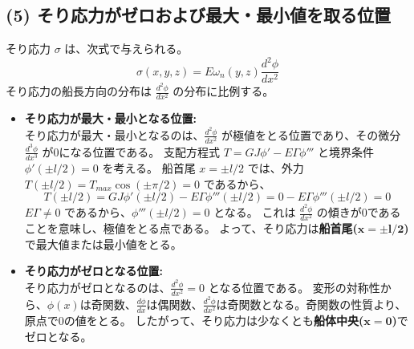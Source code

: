 \documentclass[a4j,12pt]{jsarticle}
\begin{document}
\subsection*{(5) そり応力がゼロおよび最大・最小値を取る位置}
そり応力 $\sigma$ は、次式で与えられる。
$$\sigma(x, y, z) = E \omega_n(y, z) \frac{d^2\phi}{dx^2}$$
そり応力の船長方向の分布は $\frac{d^2\phi}{dx^2}$ の分布に比例する。
\begin{itemize}
    \item \textbf{そり応力が最大・最小となる位置:} \\
    そり応力が最大・最小となるのは、$\frac{d^2\phi}{dx^2}$ が極値をとる位置であり、その微分 $\frac{d^3\phi}{dx^3}$ が0になる位置である。
    支配方程式 $T = GJ\phi' - E\Gamma\phi'''$ と境界条件 $\phi'(\pm l/2) = 0$ を考える。
    船首尾 $x=\pm l/2$ では、外力 $T(\pm l/2) = T_{max} \cos(\pm \pi/2) = 0$ であるから、
    $$T(\pm l/2) = GJ\phi'(\pm l/2) - E\Gamma\phi'''(\pm l/2) = 0 - E\Gamma\phi'''(\pm l/2) = 0$$
    $E\Gamma \neq 0$ であるから、$\phi'''(\pm l/2)=0$ となる。
    これは $\frac{d^2\phi}{dx^2}$ の傾きが0であることを意味し、極値をとる点である。
    よって、そり応力は\textbf{船首尾($\boldsymbol{x=\pm l/2}$)}で最大値または最小値をとる。

    \item \textbf{そり応力がゼロとなる位置:} \\
    そり応力がゼロとなるのは、$\frac{d^2\phi}{dx^2}=0$ となる位置である。
    変形の対称性から、$\phi(x)$は奇関数、$\frac{d\phi}{dx}$は偶関数、$\frac{d^2\phi}{dx^2}$は奇関数となる。奇関数の性質より、原点で0の値をとる。
    したがって、そり応力は少なくとも\textbf{船体中央($\boldsymbol{x=0}$)}でゼロとなる。
\end{itemize}
\end{document}
